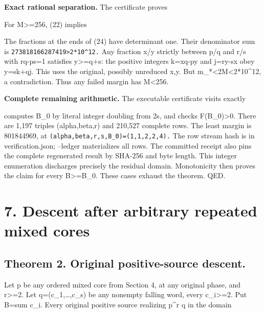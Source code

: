 \textbf{Exact rational separation.} The certificate proves


For M\textgreater=256, (22) implies


The fractions at the ends of (24) have determinant one. Their
denominator sum is \nolinkurl{273818166287419>2*10^12.} Any fraction x/y
strictly between p/q and r/s with rq-ps=1 satisfies y\textgreater=q+s:
the positive integers k=xq-py and j=ry-sx obey y=sk+qj. This uses the
original, possibly unreduced x,y. But
m\_*\textless2M\textless2*10\^{}12, a contradiction. Thus any failed
margin has M\textless256.

\textbf{Complete remaining arithmetic.} The executable certificate
visits exactly


computes B\_0 by literal integer doubling from 2s, and checks
F(B\_0)\textgreater0. There are 1,197 triples (alpha,beta,r) and 210,527
complete rows. The least margin is 801844969, at
\nolinkurl{(alpha,beta,r,s,B_0)=(1,1,2,2,4).} The row stream hash is in
verification.json; --ledger materializes all rows. The committed receipt
also pins the complete regenerated result by SHA-256 and byte length.
This integer enumeration discharges precisely the residual domain.
Monotonicity then proves the claim for every B\textgreater=B\_0. These
cases exhaust the theorem. QED.

\section{7. Descent after arbitrary repeated mixed cores}

\subsection{Theorem 2. Original positive-source descent.}

Let p be any ordered mixed core from Section 4, at any original phase,
and r\textgreater=2. Let q=(c\_1,\ldots,c\_s) be any nonempty falling
word, every c\_i\textgreater=2. Put B=sum c\_i. Every original positive
source realizing p\^{}r q in the domain

